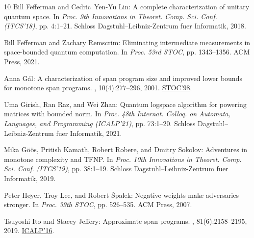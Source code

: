 \documentclass[11pt]{article}
\numberwithin{equation}{section}
\theoremstyle{definition}
\theoremstyle{plain}
\begin{document}
\begin{thebibliography}{10}
{\sc Bill Fefferman and Cedric~Yen{-}Yu Lin}: A complete characterization of
  unitary quantum space.
\newblock In {\em Proc. 9th Innovations in Theoret. Comp. Sci. Conf.
  (ITCS'18)}, pp. 4:1--21. Schloss Dagstuhl--Leibniz-Zentrum fuer Informatik,
  2018.

{\sc Bill Fefferman and Zachary Remscrim}: Eliminating intermediate
  measurements in space-bounded quantum computation.
\newblock In {\em Proc. 53rd STOC}, pp. 1343--1356. ACM Press, 2021.

{\sc Anna G{\'a}l}: A characterization of span program size and improved lower
  bounds for monotone span programs.
, 10(4):277--296, 2001.
\newblock \prelim \href{https://doi.org/10.1145/276698.276855}{STOC'98}.
\newblock [\epfmtdoi{10.1007/s000370100001}]

{\sc Uma Girish, Ran Raz, and Wei Zhan}: Quantum logspace algorithm for
  powering matrices with bounded norm.
\newblock In {\em Proc. 48th Internat. Colloq. on Automata, Languages, and
  Programming (ICALP'21)}, pp. 73:1--20. Schloss Dagstuhl--Leibniz-Zentrum fuer
  Informatik, 2021.

{\sc Mika G{\"o}{\"o}s, Pritish Kamath, Robert Robere, and Dmitry Sokolov}:
  Adventures in monotone complexity and {TFNP}.
\newblock In {\em Proc. 10th Innovations in Theoret. Comp. Sci. Conf.
  (ITCS'19)}, pp. 38:1--19. Schloss Dagstuhl--Leibniz-Zentrum fuer Informatik,
  2019.

{\sc Peter H{\o}yer, Troy Lee, and Robert {\v{S}}palek}: Negative weights make
  adversaries stronger.
\newblock In {\em Proc. 39th STOC}, pp. 526--535. ACM Press, 2007.
\newblock [\epfmtdoi{10.1145/1250790.1250867}]

{\sc Tsuyoshi Ito and Stacey Jeffery}: Approximate span programs.
, 81(6):2158--2195, 2019.
\newblock \prelim
  \href{https://doi.org/10.4230/LIPIcs.ICALP.2016.12}{ICALP'16}.


\end{thebibliography}
\end{document}
